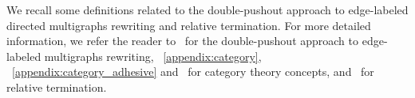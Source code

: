  We recall some definitions related to the double-pushout approach to edge-labeled directed multigraphs rewriting and relative termination. For more detailed information, we refer the reader to~\cite{konig2018atutorial,ehrig1997algebraic} for the double-pushout approach to edge-labeled multigraphs rewriting, \textsection~\ref{appendix:category}, \textsection~\ref{appendix:category_adhesive} and~\cite{pierce1991basic, barr1990category} for category theory concepts, and~\cite{geser1990relative} for relative termination.